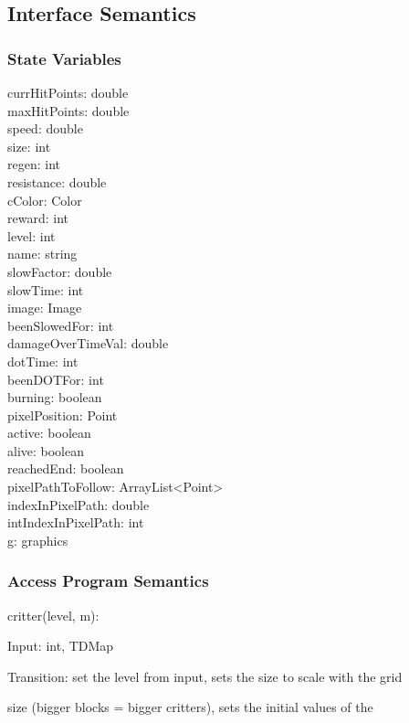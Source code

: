 \documentclass[12,english]{article}
\begin{document}
	\subsection{Interface Semantics}
		\subsubsection{State Variables}
		currHitPoints: double\\
		maxHitPoints: double\\
		speed: double\\
		size: int\\
		regen: int\\
		resistance: double\\
		cColor: Color\\
		reward: int\\
		level: int\\
		name: string\\
		slowFactor: double\\
		slowTime: int\\
		image: Image\\
		beenSlowedFor: int\\
		damageOverTimeVal: double\\
		dotTime: int\\
		beenDOTFor: int\\
		burning: boolean\\
		pixelPosition: Point\\
		active: boolean\\
		alive: boolean\\
		reachedEnd: boolean\\
		pixelPathToFollow: ArrayList<Point>\\
		indexInPixelPath: double\\
		intIndexInPixelPath: int\\
        g: graphics\\
		
		
		
	

		\subsubsection{Access Program Semantics}
        critter(level, m):

		    Input: int, TDMap
		
		    Transition: set the level from input, sets the size to scale with the grid 
		    
		    size (bigger blocks = bigger critters), sets the initial values of the 
		    
\end{document}
